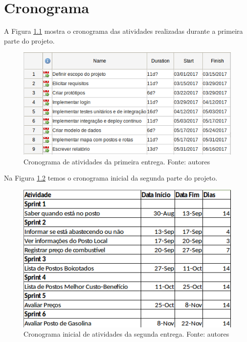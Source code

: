 \chapter[Cronograma]{Cronograma}
\label{chap:crono}

A Figura \ref{img:cronograma} mostra o cronograma das atividades realizadas durante a primeira parte do projeto.

\begin{figure}[H]
    \centering
    \includegraphics[scale=0.5]{figuras/cronograma_r1.png}
    \caption[Cronograma de atividades da primeira entrega.]{Cronograma de atividades da primeira entrega. Fonte: autores}
    \label{img:cronograma}
\end{figure}

Na Figura \ref{img:cronograma2inicial} temos o cronograma inicial da segunda parte do projeto.

\begin{figure}[H]
    \centering
    \includegraphics[scale=0.5]{figuras/cronograma_r2_inicial.png}
    \caption[Cronograma inicial de atividades da segunda entrega.]{Cronograma inicial de atividades da segunda entrega. Fonte: autores}
    \label{img:cronograma2inicial}
\end{figure}

